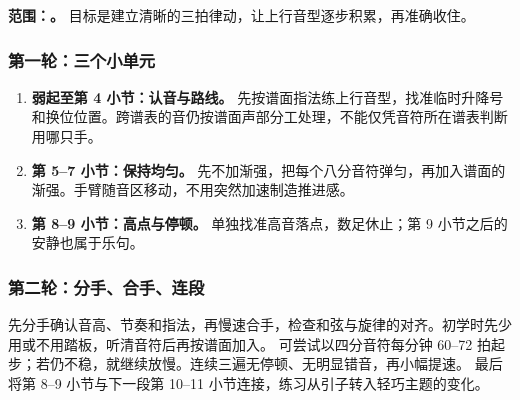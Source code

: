 \textbf{范围：\CurrentSegmentRange。} 目标是建立清晰的三拍律动，让上行音型逐步积累，再准确收住。

\SegmentScore

\subsubsection*{第一轮：三个小单元}
\begin{enumerate}
\item \textbf{弱起至第 4 小节：认音与路线。} 先按谱面指法练上行音型，找准临时升降号和换位位置。跨谱表的音仍按谱面声部分工处理，不能仅凭音符所在谱表判断用哪只手。
\item \textbf{第 5--7 小节：保持均匀。} 先不加渐强，把每个八分音符弹匀，再加入谱面的渐强。手臂随音区移动，不用突然加速制造推进感。
\item \textbf{第 8--9 小节：高点与停顿。} 单独找准高音落点，数足休止；第 9 小节之后的安静也属于乐句。
\end{enumerate}

\subsubsection*{第二轮：分手、合手、连段}
先分手确认音高、节奏和指法，再慢速合手，检查和弦与旋律的对齐。初学时先少用或不用踏板，听清音符后再按谱面加入。
可尝试以四分音符每分钟 60--72 拍起步；若仍不稳，就继续放慢。连续三遍无停顿、无明显错音，再小幅提速。
最后将第 8--9 小节与下一段第 10--11 小节连接，练习从引子转入轻巧主题的变化。
